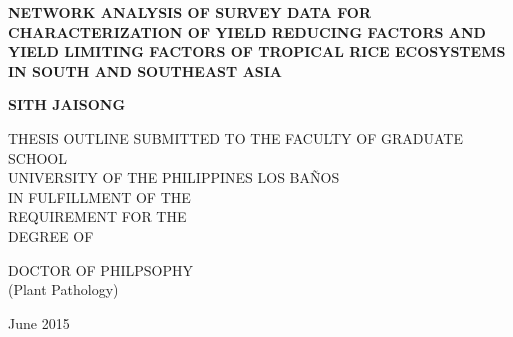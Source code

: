 \pagestyle{empty}

\begin{titlepage}
\begin{spacing}{1.5}
        \begin{center}
        \vspace*{0cm}

        \large
        {\bf NETWORK ANALYSIS OF SURVEY DATA FOR CHARACTERIZATION OF YIELD REDUCING FACTORS AND YIELD LIMITING FACTORS OF TROPICAL RICE ECOSYSTEMS IN SOUTH AND SOUTHEAST ASIA}

        \vspace*{3.0cm}

        \large
        \bf{SITH JAISONG} \\

        \vspace*{3.0cm}

        \large
        THESIS OUTLINE SUBMITTED TO THE FACULTY OF GRADUATE SCHOOL\\
        UNIVERSITY OF THE PHILIPPINES LOS BA\~NOS\\ 
 IN FULFILLMENT OF THE \\
        REQUIREMENT FOR THE \\ 
        DEGREE OF \\
        \vspace*{2.0cm}
        \begin{singlespace}
        DOCTOR OF PHILPSOPHY \\
        (Plant Pathology) \\
		\end{singlespace}
        \vspace*{1.0cm}
        June 2015
        \end{center}
        \end{spacing}
\end{titlepage}
\cleardoublepage
